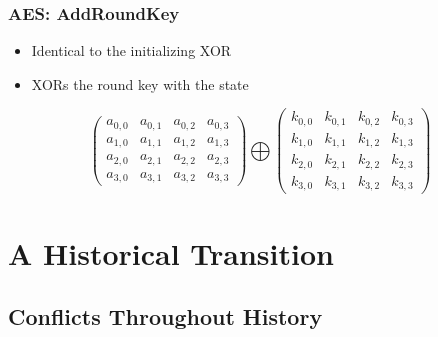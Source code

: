 \documentclass[12pt]{beamer}
\begin{document}
\begin{frame}
\frametitle{AES: AddRoundKey}
\begin{itemize}
\item Identical to the initializing XOR
\item XORs the round key with the state
\end{itemize}
\begin{center}
\[ 
\left( \begin{array}{cccc}
a_{0,0} & a_{0,1} & a_{0,2} & a_{0,3} \\
a_{1,0} & a_{1,1} & a_{1,2} & a_{1,3} \\
a_{2,0} & a_{2,1} & a_{2,2} & a_{2,3} \\
a_{3,0} & a_{3,1} & a_{3,2} & a_{3,3}\end{array} \right)
\bigoplus
\left( \begin{array}{cccc}
k_{0,0} & k_{0,1} & k_{0,2} & k_{0,3} \\
k_{1,0} & k_{1,1} & k_{1,2} & k_{1,3} \\
k_{2,0} & k_{2,1} & k_{2,2} & k_{2,3} \\
k_{3,0} & k_{3,1} & k_{3,2} & k_{3,3}\end{array} \right)
\]
\end{center}
\end{frame}

\section{A Historical Transition}

\subsection{Conflicts Throughout History}
\end{document}
